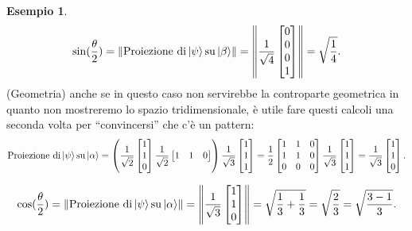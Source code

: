 \documentclass{book}
\theoremstyle{definition}
\theoremstyle{definition}
\theoremstyle{definition}
\newtheorem*{ex}{Esempio}
\theoremstyle{plain}
\theoremstyle{plain}
\theoremstyle{plain}
\theoremstyle{plain}
\begin{document}
\begin{ex}
\begin{displaymath}
\sin(\frac{\theta}{2}) = \left\lVert \text{Proiezione di} \ket{\psi} \text{su} \ket{\beta} \right\rVert = \left\lVert \frac{1}{\sqrt{4}} \begin{bmatrix}
0 \\
0 \\
0 \\
1
\end{bmatrix} \right\rVert = \sqrt{\frac{1}{4}}.
\end{displaymath}
(Geometria) anche se in questo caso non servirebbe la controparte geometrica in quanto non mostreremo lo spazio tridimensionale, è utile fare questi calcoli una seconda volta per ``convincersi'' che c'è un pattern: 
\begin{displaymath}
\text{Proiezione di} \ket{\psi} \text{su} \ket{\alpha} = \left( \frac{1}{\sqrt{2}}  \begin{bmatrix}
1 \\
1 \\
0
\end{bmatrix}
\frac{1}{\sqrt{2}} \begin{bmatrix}
1 & 1 & 0
\end{bmatrix}
\right)
\frac{1}{\sqrt{3}} \begin{bmatrix}
1 \\
1 \\
1
\end{bmatrix} = \frac{1}{2} \begin{bmatrix}
1 & 1 & 0 \\
1 & 1 & 0 \\
0 & 0 & 0
\end{bmatrix} \frac{1}{\sqrt{3}} \begin{bmatrix}
1 \\
1 \\
1
\end{bmatrix} = \frac{1}{\sqrt{3}} \begin{bmatrix}
1 \\
1 \\
0
\end{bmatrix}.
\end{displaymath}

\begin{displaymath}
\cos(\frac{\theta}{2}) = \left\lVert \text{Proiezione di} \ket{\psi} \text{su} \ket{\alpha} \right\rVert = \left\lVert \frac{1}{\sqrt{3}} \begin{bmatrix}
1 \\
1 \\
0
\end{bmatrix} \right\rVert = \sqrt{\frac{1}{3} + \frac{1}{3}} = \sqrt{\frac{2}{3}} = \sqrt{\frac{3 - 1}{3}}.
\end{displaymath}


\end{ex}
\end{document}
